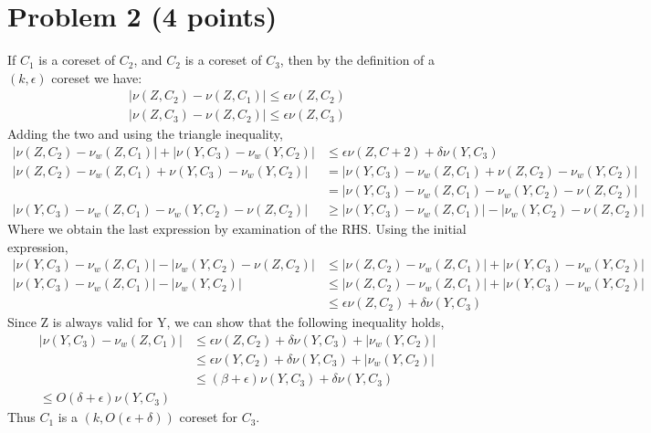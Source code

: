 \documentclass[letterpaper, 11pt]{article}
\begin{document}
\section*{Problem 2 (4 points)}
If $C_1$ is a coreset of $C_2$, and $C_2$ is a coreset of $C_3$, then by the definition of a $(k,\epsilon)$ coreset we have:
\begin{align*}
|\nu(Z,C_2) - \nu(Z,C_1)| \leq \epsilon\nu(Z,C_2) \\
|\nu(Z,C_3) - \nu(Z,C_2)| \leq \epsilon\nu(Z,C_3)
\end{align*}
Adding the two and using the triangle inequality,
\begin{align*}
|\nu(Z,C_2) - \nu_w(Z,C_1)| + |\nu(Y,C_3)-\nu_w(Y,C_2)| &\leq \epsilon\nu(Z,C+2) + \delta\nu(Y,C_3) \\
|\nu(Z,C_2) - \nu_w(Z,C_1) + \nu(Y,C_3)-\nu_w(Y,C_2)| &= |\nu(Y,C_3) - \nu_w(Z,C_1) + \nu(Z,C_2)-\nu_w(Y,C_2)| \\
&= |\nu(Y,C_3) - \nu_w(Z,C_1) - \nu_w(Y,C_2)-\nu(Z,C_2)| \\
|\nu(Y,C_3) - \nu_w(Z,C_1) - \nu_w(Y,C_2)-\nu(Z,C_2)| &\geq |\nu(Y,C_3)-\nu_w(Z,C_1)| - |\nu_w(Y,C_2)-\nu(Z,C_2)|
\end{align*}
Where we obtain the last expression by examination of the RHS. Using the initial expression,
\begin{align*}
|\nu(Y,C_3)-\nu_w(Z,C_1)| - |\nu_w(Y,C_2)-\nu(Z,C_2)| &\leq |\nu(Z,C_2) - \nu_w(Z,C_1)| + |\nu(Y,C_3)-\nu_w(Y,C_2)| \\
|\nu(Y,C_3)-\nu_w(Z,C_1)| - |\nu_w(Y,C_2)| &\leq |\nu(Z,C_2) - \nu_w(Z,C_1)| + |\nu(Y,C_3)-\nu_w(Y,C_2)| \\
&\leq \epsilon\nu(Z,C_2) + \delta\nu(Y,C_3)
\end{align*}
Since Z is always valid for Y, we can show that the following inequality holds,
\begin{align*}
|\nu(Y,C_3)-\nu_w(Z,C_1)| &\leq \epsilon\nu(Z,C_2) + \delta\nu(Y,C_3) + |\nu_w(Y,C_2)| \\
&\leq  \epsilon\nu(Y,C_2) + \delta\nu(Y,C_3) + |\nu_w(Y,C_2)| \\
&\leq (\beta + \epsilon)\nu(Y,C_3) + \delta\nu(Y,C_3) \\
\leq O(\delta + \epsilon)\nu(Y,C_3)
\end{align*}
Thus $C_1$ is a $(k,O(\epsilon + \delta))$ coreset for $C_3$.



\pagebreak
\end{document}
